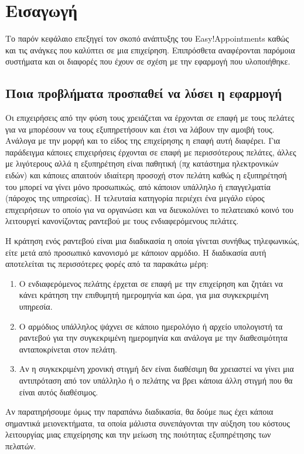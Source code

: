 \chapter{Εισαγωγή}
\leftmark\rightmark
Το παρόν κεφάλαιο επεξηγεί τον σκοπό ανάπτυξης του Easy!Appointments καθώς και τις ανάγκες που καλύπτει σε μια επιχείρηση. Επιπρόσθετα αναφέρονται παρόμοια συστήματα και οι διαφορές που έχουν σε σχέση με την εφαρμογή που υλοποιήθηκε.

\section {Ποια προβλήματα προσπαθεί να λύσει η εφαρμογή}
Οι επιχειρήσεις από την φύση τους χρειάζεται να έρχονται σε επαφή με τους πελάτες για να μπορέσουν να τους εξυπηρετήσουν και έτσι να λάβουν την αμοιβή τους. Ανάλογα με την μορφή και το είδος της επιχείρησης η επαφή αυτή διαφέρει. Για παράδειγμα κάποιες επιχειρήσεις έρχονται σε επαφή με περισσότερους πελάτες, άλλες με λιγότερους αλλά η εξυπηρέτηση είναι παθητική (πχ κατάστημα ηλεκτρονικών ειδών) και κάποιες απαιτούν ιδιαίτερη προσοχή στον πελάτη καθώς η εξυπηρέτησή του μπορεί να γίνει μόνο προσωπικώς, από κάποιον υπάλληλο ή επαγγελματία (πάροχος της υπηρεσίας). Η τελευταία κατηγορία περιέχει ένα μεγάλο εύρος επιχειρήσεων το οποίο για να οργανώσει και να διευκολύνει το πελατειακό κοινό του λειτουργεί κανονίζοντας ραντεβού με τους ενδιαφερόμενους πελάτες.

Η κράτηση ενός ραντεβού είναι μια διαδικασία η οποία γίνεται συνήθως τηλεφωνικώς, είτε μετά από προσωπικό κανονισμό με κάποιον αρμόδιο. Η διαδικασία αυτή αποτελείται τις περισσότερες φορές από τα παρακάτω μέρη:  
\begin{enumerate}
\item Ο ενδιαφερόμενος πελάτης έρχεται σε επαφή με την επιχείρηση και ζητάει να κάνει κράτηση την επιθυμητή ημερομηνία και ώρα, για μια συγκεκριμένη υπηρεσία. 
\item Ο αρμόδιος υπάλληλος ψάχνει σε κάποιο ημερολόγιο ή αρχείο υπολογιστή τα ραντεβού για την συγκεκριμένη ημερομηνία και ανάλογα με την διαθεσιμότητα ανταποκρίνεται στον πελάτη.
\item Αν η συγκεκριμένη χρονική στιγμή δεν είναι διαθέσιμη θα χρειαστεί να γίνει μια αντιπρόταση από τον υπάλληλο ή ο πελάτης να βρει κάποια άλλη στιγμή που θα είναι αυτός διαθέσιμος.
\end{enumerate} 
Αν παρατηρήσουμε όμως την παραπάνω διαδικασία, θα δούμε πως έχει κάποια σημαντικά μειονεκτήματα, τα οποία μάλιστα συνεπάγονται την αύξηση του κόστους λειτουργίας μιας επιχείρησης και την μείωση της ποιότητας εξυπηρέτησης των πελατών. 

